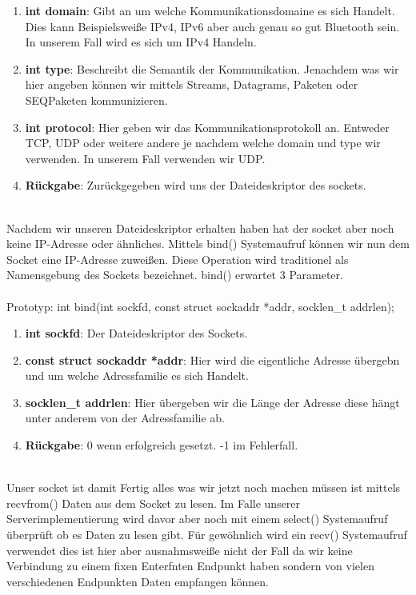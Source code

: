 \begin{enumerate}
    \item \textbf{int domain}: Gibt an um welche Kommunikationsdomaine es sich Handelt. Dies kann Beispielsweiße IPv4, IPv6 aber auch genau so gut Bluetooth sein. In unserem Fall wird es sich um IPv4 Handeln.
    \item \textbf{int type}: Beschreibt die Semantik der Kommunikation. Jenachdem was wir hier angeben können wir mittels Streams, Datagrams, Paketen oder SEQPaketen kommunizieren.
    \item \textbf{int protocol}: Hier geben wir das Kommunikationsprotokoll an. Entweder TCP, UDP oder weitere andere je nachdem welche domain und type wir verwenden. In unserem Fall verwenden wir UDP.
    \item \textbf{Rückgabe}: Zurückgegeben wird uns der Dateideskriptor des sockets.
\end{enumerate} 
\ \\%
Nachdem wir unseren Dateideskriptor erhalten haben hat der socket aber noch keine IP-Adresse oder ähnliches. Mittels bind() Systemaufruf können wir nun dem Socket eine IP-Adresse zuweißen. Diese Operation wird traditionel als Namensgebung des Sockets bezeichnet. bind() erwartet 3 Parameter.
\\\\
Prototyp: int bind(int sockfd, const struct sockaddr *addr, socklen\_t addrlen);
\begin{enumerate}
    \item \textbf{int sockfd}: Der Dateideskriptor des Sockets.
    \item \textbf{const struct sockaddr *addr}: Hier wird die eigentliche Adresse übergebn und um welche Adressfamilie es sich Handelt. 
    \item \textbf{socklen\_t addrlen}: Hier übergeben wir die Länge der Adresse diese hängt unter anderem von der Adressfamilie ab.
    \item \textbf{Rückgabe}: 0 wenn erfolgreich gesetzt. -1 im Fehlerfall.
\end{enumerate} 
\ \\%
Unser socket ist damit Fertig alles was wir jetzt noch machen müssen ist mittels recvfrom() Daten aus dem Socket zu lesen. Im Falle unserer Serverimplementierung wird davor aber noch mit einem select() Systemaufruf überprüft ob es Daten zu lesen gibt. Für gewöhnlich wird ein recv() Systemaufruf verwendet dies ist hier aber ausnahmsweiße nicht der Fall da wir keine Verbindung zu einem fixen Enterfnten Endpunkt haben sondern von vielen verschiedenen Endpunkten Daten empfangen können.
